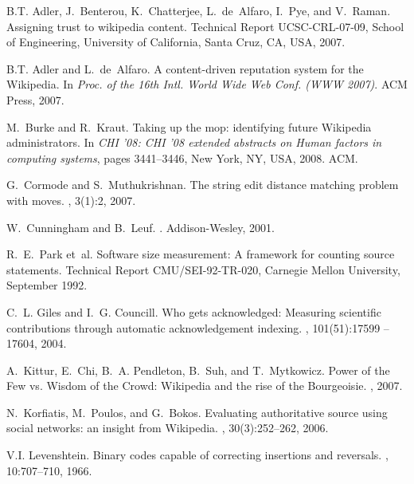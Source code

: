 \documentclass{sig-alternate}
\begin{document}
\begin{thebibliography}{10}

B.T. Adler, J.~Benterou, K.~Chatterjee, L.~de~Alfaro, I.~Pye, and V.~Raman.
\newblock Assigning trust to wikipedia content.
\newblock Technical Report UCSC-CRL-07-09, School of Engineering, University of
  California, Santa Cruz, CA, USA, 2007.

B.T. Adler and L.~de~Alfaro.
\newblock A content-driven reputation system for the {Wikipedia}.
\newblock In {\em Proc. of the 16th Intl. World Wide Web Conf. (WWW 2007)}.
  {ACM} Press, 2007.

M.~Burke and R.~Kraut.
\newblock Taking up the mop: identifying future {W}ikipedia administrators.
\newblock In {\em CHI '08: CHI '08 extended abstracts on Human factors in
  computing systems}, pages 3441--3446, New York, NY, USA, 2008. ACM.

G.~Cormode and S.~Muthukrishnan.
\newblock The string edit distance matching problem with moves.
, 3(1):2, 2007.

W.~Cunningham and B.~Leuf.
.
\newblock Addison-Wesley, 2001.

R.~E.~Park et~al.
\newblock Software size measurement: A framework for counting source
  statements.
\newblock Technical Report CMU/SEI-92-TR-020, Carnegie Mellon University,
  September 1992.

C.~L. Giles and I.~G. Councill.
\newblock Who gets acknowledged: Measuring scientific contributions through
  automatic acknowledgement indexing.
, 101(51):17599 --
  17604, 2004.

A.~Kittur, E.~Chi, B.~A. Pendleton, B.~Suh, and T.~Mytkowicz.
\newblock Power of the {F}ew vs. {W}isdom of the {C}rowd: {W}ikipedia and the
  rise of the {B}ourgeoisie.
, 2007.

N.~Korfiatis, M.~Poulos, and G.~Bokos.
\newblock Evaluating authoritative source using social networks: an insight
  from {W}ikipedia.
, 30(3):252--262, 2006.

V.I. Levenshtein.
\newblock Binary codes capable of correcting insertions and reversals.
, 10:707--710, 1966.


\end{thebibliography}
\end{document}
